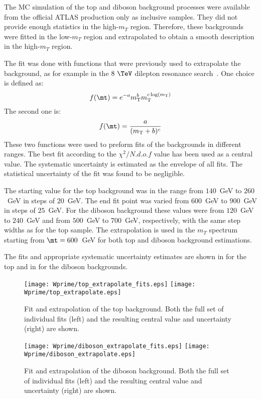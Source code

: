 The MC simulation of the top and diboson background processes were available from the official ATLAS production only as inclusive samples.
They did not provide enough statistics in the high-$m_T$ region.
Therefore, these backgrounds were fitted in the low-$m_T$ region and extrapolated to obtain a smooth description in the high-$m_T$ region.

The fit was done with functions that were previously used to extrapolate the background, as for example in the $8~\TeV$ dilepton resonance search~\cite{Aad:2014cka}.
One choice is defined as:
\begin{equation}
 f(\mt) = e^{-a} m_\mathrm{T}^{b} m_\mathrm{T}^{c \log(m_\mathrm{T})}
  \label{eq:dijetfunc}
\end{equation}
The second one is:
\begin{equation}
 f(\mt) = \frac{a}{(m_\mathrm{T}+b)^{c}}
  \label{eq:powerlaw}
\end{equation}
These two functions were used to preform fits of the backgrounds in different ranges. 
The best fit according to the $\chi^{2}/N.d.o.f$ value has been used as a central value.
The systematic uncertainty is estimated as the envelope of all fits.
The statistical uncertainty of the fit was found to be negligible.

The starting value for the top background was in the range from $140$~GeV to $260$~GeV in steps of $20$~GeV. The end fit point was varied from $600$~GeV to $900$~GeV in steps of $25$~GeV.
For the diboson background these values were from $120$~GeV to $240$~GeV and from $500$~GeV to $700$~GeV, respectively, with the same step widths as for the top sample.
The extrapolation is used in the $m_T$ spectrum starting from $\mt=600$~GeV for both top and diboson background estimations.

The fits and appropriate systematic uncertainty estimates are shown in 
 for the top and in  for the diboson backgrounds.
\begin{figure}[!htb]
  \centering
  \texttt{[image: Wprime/top\_extrapolate\_fits.eps]}
  \texttt{[image: Wprime/top\_extrapolate.eps]}
  \caption{Fit and extrapolation of the top background. Both the full set of individual
fits (left) and the resulting central value and uncertainty (right) are shown.}
  \label{fig:mu_extrapolate_top}
\end{figure}
\begin{figure}[!htb]
  \centering
  \texttt{[image: Wprime/diboson\_extrapolate\_fits.eps]}
  \texttt{[image: Wprime/diboson\_extrapolate.eps]}
  \caption{Fit and extrapolation of the diboson background. Both the full set of individual
fits (left) and the resulting central value and uncertainty (right) are shown.}
  \label{fig:mu_extrapolate_diboson}
\end{figure}

